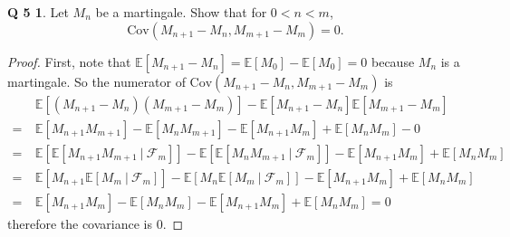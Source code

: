 \documentclass[12pt]{article}
\newcommand{\E}{\mathbb{E}}
\theoremstyle{definition}
\newtheorem*{prob5}{Q 5}
\begin{document}
\begin{prob5}
Let $M_n$ be a martingale.  Show that for $0 < n < m$, $$\text{Cov}(M_{n+1} - M_n, M_{m+1} - M_m) = 0.$$
\end{prob5}

\begin{proof}
First, note that $\E\left[M_{n+1} - M_n\right] = \E\left[M_0\right] - \E\left[M_0\right] = 0$ because $M_n$ is a martingale.  So the numerator of $\text{Cov}(M_{n+1} - M_n, M_{m+1} - M_m)$ is
\begin{align*}
& \E\left[(M_{n+1} - M_n)(M_{m+1} - M_m)\right] - \E\left[M_{n+1} - M_n\right] \E\left[M_{m+1} - M_m\right]
\\
= \ & \E\left[M_{n+1}M_{m+1}\right] - \E\left[M_n M_{m+1}\right] - \E\left[M_{n+1}M_m\right] + \E\left[M_n M_m\right] - 0
\\
= \ & \E\left[\E\left[M_{n+1}M_{m+1} \ | \ \mathcal{F}_m\right]\right] - \E\left[\E\left[M_n M_{m+1} \ | \ \mathcal{F}_m\right]\right] - \E\left[M_{n+1}M_m\right] + \E\left[M_n M_m\right]
\\
= \ & \E\left[M_{n+1} \E\left[M_m \ | \ \mathcal{F}_m\right]\right] - \E\left[M_n \E\left[M_m \ | \ \mathcal{F}_m\right]\right] - \E\left[M_{n+1}M_m\right] + \E\left[M_n M_m\right]
\\
= \ & \E\left[M_{n+1}M_m\right] - \E\left[M_nM_m\right] - \E\left[M_{n+1}M_m\right] + \E\left[M_n M_m\right] = 0
\end{align*}
therefore the covariance is 0.
\end{proof}
\end{document}
